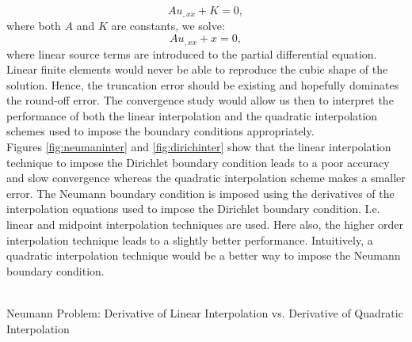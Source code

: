 \documentclass[a4paper,12pt]{article}
\makeatletter
\newenvironment{figurehere}
  {\def\@captype{figure}}
  {}
\makeatother
\begin{document}
\begin{equation}
 A u_{,xx}+K = 0,
\end{equation}
where both $A$ and $K$ are constants, we solve:
\begin{equation}
 A u_{,xx}+ x = 0,
\end{equation}
where linear source terms are introduced to the partial differential equation. Linear finite elements would never be able to reproduce the cubic shape of the solution. Hence, the truncation error should be existing and hopefully dominates the round-off error. The convergence study would allow us then to interpret the performance of both the linear interpolation and the quadratic interpolation schemes used to impose the boundary conditions appropriately.\\
Figures \ref{fig:neumaninter} and \ref{fig:dirichinter} show that the linear interpolation technique to impose the Dirichlet boundary condition leads to a poor accuracy and slow convergence whereas the quadratic interpolation scheme makes a smaller error. The Neumann boundary condition is imposed using the derivatives of the interpolation equations used to impose the Dirichlet boundary condition. I.e. linear and midpoint interpolation techniques are used.  Here also, the higher order interpolation technique leads to a slightly better performance. Intuitively, a quadratic interpolation technique would be a better way to impose the Neumann boundary condition. 
\begin{center}
\begin{figurehere}
\\
\caption{Neumann Problem: Derivative of Linear Interpolation vs. Derivative of Quadratic Interpolation}\label{fig:neumaninter}
\end{figurehere}
\end{center}
\end{document}
